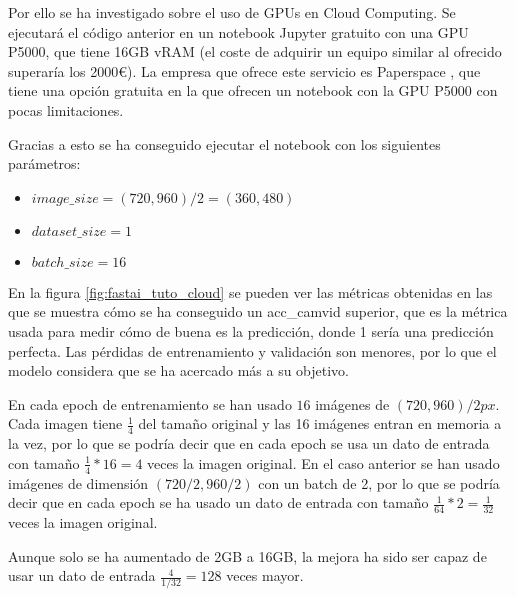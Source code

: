 Por ello se ha investigado sobre el uso de GPUs en Cloud Computing. Se ejecutará el código anterior en un notebook Jupyter gratuito con una GPU P5000, que tiene 16GB vRAM (el coste de adquirir un equipo similar al ofrecido superaría los 2000€). La empresa que ofrece este servicio es Paperspace \cite{Paperspace2020}, que tiene una opción gratuita en la que ofrecen un notebook con la GPU P5000 con pocas limitaciones.

Gracias a esto se ha conseguido ejecutar el notebook con los siguientes parámetros:

\begin{itemize}
\item $image\_size = (720, 960) / 2 = (360, 480)$
\item $dataset\_size = 1$
\item $batch\_size = 16$
\end{itemize}


En la figura \ref{fig:fastai_tuto_cloud} se pueden ver las métricas obtenidas en las que se muestra cómo se ha conseguido un acc\_camvid superior, que es la métrica usada para medir cómo de buena es la predicción, donde 1 sería una predicción perfecta. Las pérdidas de entrenamiento y validación son menores, por lo que el modelo considera que se ha acercado más a su objetivo.

En cada epoch de entrenamiento se han usado $16$ imágenes de $(720, 960) / 2px$. Cada imagen tiene $\frac{1}{4}$ del tamaño original y las 16 imágenes entran en memoria a la vez, por lo que se podría decir que en cada epoch se usa un dato de entrada con tamaño $\frac{1}{4}*16=4$ veces la imagen original. En el caso anterior se han usado imágenes de dimensión $(720/2, 960/2)$ con un batch de 2, por lo que se podría decir que en cada epoch se ha usado un dato de entrada con tamaño $\frac{1}{64}*2=\frac{1}{32}$ veces la imagen original.

Aunque solo se ha aumentado de 2GB a 16GB, la mejora ha sido ser capaz de usar un dato de entrada $\frac{4}{1/32} = 128$ veces mayor.